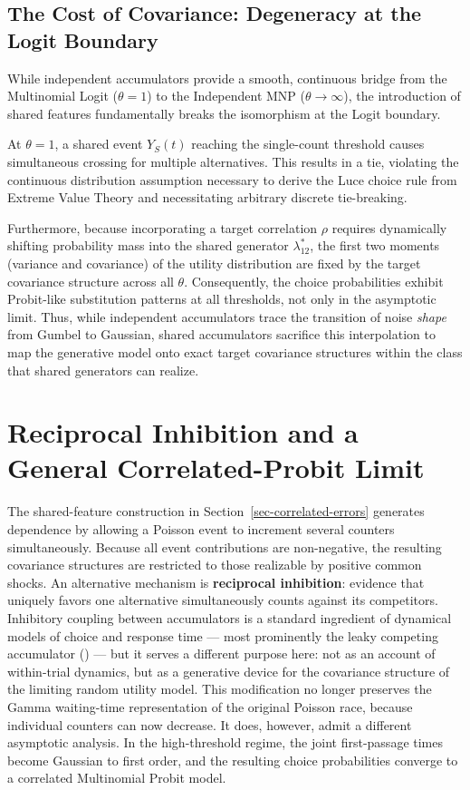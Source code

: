 \documentclass[
  man,
  floatsintext,
  longtable,
  a4paper,
  nolmodern,
  notxfonts,
  notimes,
  colorlinks=true,linkcolor=blue,citecolor=blue,urlcolor=blue]{apa7}
\begin{document}
\subsection{The Cost of Covariance: Degeneracy at the Logit
Boundary}\label{the-cost-of-covariance-degeneracy-at-the-logit-boundary}

While independent accumulators provide a smooth, continuous bridge from
the Multinomial Logit (\(\theta=1\)) to the Independent MNP
(\(\theta \to \infty\)), the introduction of shared features
fundamentally breaks the isomorphism at the Logit boundary.

At \(\theta=1\), a shared event \(Y_S(t)\) reaching the single-count
threshold causes simultaneous crossing for multiple alternatives. This
results in a tie, violating the continuous distribution assumption
necessary to derive the Luce choice rule from Extreme Value Theory and
necessitating arbitrary discrete tie-breaking.

Furthermore, because incorporating a target correlation \(\rho\)
requires dynamically shifting probability mass into the shared generator
\(\lambda_{12}^*\), the first two moments (variance and covariance) of
the utility distribution are fixed by the target covariance structure
across all \(\theta\). Consequently, the choice probabilities exhibit
Probit-like substitution patterns at all thresholds, not only in the
asymptotic limit. Thus, while independent accumulators trace the
transition of noise \emph{shape} from Gumbel to Gaussian, shared
accumulators sacrifice this interpolation to map the generative model
onto exact target covariance structures within the class that shared
generators can realize.

\section{Reciprocal Inhibition and a General Correlated-Probit
Limit}\label{sec-inhibitory-race}

The shared-feature construction in Section~\ref{sec-correlated-errors}
generates dependence by allowing a Poisson event to increment several
counters simultaneously. Because all event contributions are
non-negative, the resulting covariance structures are restricted to
those realizable by positive common shocks. An alternative mechanism is
\textbf{reciprocal inhibition}: evidence that uniquely favors one
alternative simultaneously counts against its competitors. Inhibitory
coupling between accumulators is a standard ingredient of dynamical
models of choice and response time --- most prominently the leaky
competing accumulator
() --- but it serves a different purpose here: not as an account of
within-trial dynamics, but as a generative device for the covariance
structure of the limiting random utility model. This modification no
longer preserves the Gamma waiting-time representation of the original
Poisson race, because individual counters can now decrease. It does,
however, admit a different asymptotic analysis. In the high-threshold
regime, the joint first-passage times become Gaussian to first order,
and the resulting choice probabilities converge to a correlated
Multinomial Probit model.
\end{document}
